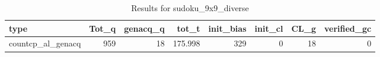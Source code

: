 \begin{table}[ht]
\caption{Results for sudoku_9x9_diverse}
\begin{tabular}{lrrrrrrr}
\hline
 type              &   Tot\_q &   genacq\_q &   tot\_t &   init\_bias &   init\_cl &   CL\_g &   verified\_gc \\
\hline
 countcp\_al\_genacq &     959 &         18 & 175.998 &         329 &         0 &     18 &             0 \\
\hline
\end{tabular}
\end{table}